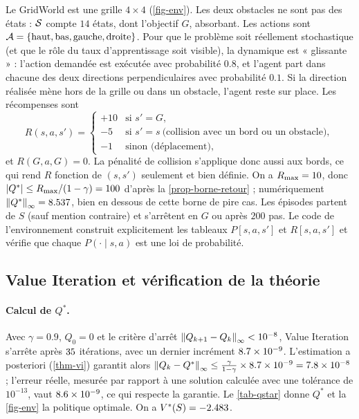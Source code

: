Le GridWorld est une grille $4\times4$ (\cref{fig-env}). Les deux obstacles ne sont pas des états : $\mathcal{S}$ compte $14$ états, dont l'objectif $G$, absorbant. Les actions sont $\mathcal{A}=\{\text{haut},\text{bas},\text{gauche},\text{droite}\}$. Pour que le problème soit réellement stochastique (et que le rôle du taux d'apprentissage soit visible), la dynamique est « glissante » : l'action demandée est exécutée avec probabilité $0.8$, et l'agent part dans chacune des deux directions perpendiculaires avec probabilité $0.1$. Si la direction réalisée mène hors de la grille ou dans un obstacle, l'agent reste sur place. Les récompenses sont
\[
R(s,a,s')=\begin{cases}+10&\text{si }s'=G,\\-5&\text{si }s'=s\ \text{(collision avec un bord ou un obstacle)},\\-1&\text{sinon (déplacement)},\end{cases}
\]
et $R(G,a,G)=0$. La pénalité de collision s'applique donc aussi aux bords, ce qui rend $R$ fonction de $(s,s')$ seulement et bien définie. On a $R_{\max}=10$, donc $\left\lvert Q^* \right\rvert\le R_{\max}/(1-\gamma)=100$ d'après la \cref{prop-borne-retour} ; numériquement $\left\lVert Q^* \right\rVert_\infty=8.537$, bien en dessous de cette borne de pire cas. Les épisodes partent de $S$ (sauf mention contraire) et s'arrêtent en $G$ ou après $200$ pas. Le code de l'environnement construit explicitement les tableaux $P[s,a,s']$ et $R[s,a,s']$ et vérifie que chaque $P(\cdot\mid s,a)$ est une loi de probabilité.

\FloatBarrier
\subsection{Value Iteration et vérification de la théorie}\label{sec-exp-vi}

\paragraph{Calcul de $Q^*$.} Avec $\gamma=0.9$, $Q_0=0$ et le critère d'arrêt $\left\lVert Q_{k+1}-Q_k \right\rVert_\infty<10^{-8}$, Value Iteration s'arrête après $35$ itérations, avec un dernier incrément $8.7\times10^{-9}$. L'estimation a posteriori (\cref{thm-vi}) garantit alors $\left\lVert Q_k-Q^* \right\rVert_\infty\le\frac{\gamma}{1-\gamma}\times8.7\times10^{-9}=7.8\times10^{-8}$ ; l'erreur réelle, mesurée par rapport à une solution calculée avec une tolérance de $10^{-13}$, vaut $8.6\times10^{-9}$, ce qui respecte la garantie. Le \cref{tab-qstar} donne $Q^*$ et la \cref{fig-env} la politique optimale. On a $V^*(S)=-2.483$.

